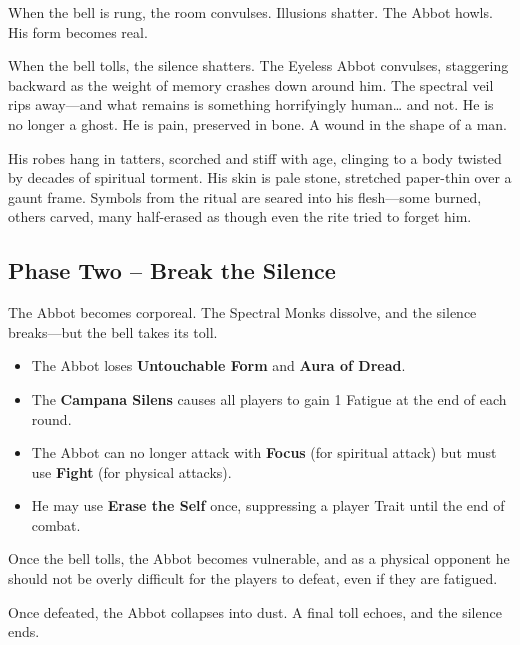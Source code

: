 \documentclass[twocolumn,nodeprecatedcode,bg=print]{dndbook/dndbook}
\begin{document}
When the bell is rung, the room convulses. Illusions shatter. The Abbot howls. His form becomes real.

\begin{WyrdExample}
    When the bell tolls, the silence shatters.  The Eyeless Abbot convulses, staggering backward as the weight of memory crashes down around him. The spectral veil rips away—and what remains is something horrifyingly human… and not. He is no longer a ghost. He is pain, preserved in bone. A wound in the shape of a man.
    
    His robes hang in tatters, scorched and stiff with age, clinging to a body twisted by decades of spiritual torment. His skin is pale stone, stretched paper-thin over a gaunt frame. Symbols from the ritual are seared into his flesh—some burned, others carved, many half-erased as though even the rite tried to forget him.
\end{WyrdExample}


\subsection*{Phase Two – Break the Silence}

The Abbot becomes corporeal. The Spectral Monks dissolve, and the silence breaks—but the bell takes its toll.

\begin{WyrdExample}
    \begin{itemize}
    \item The Abbot loses \textbf{Untouchable Form} and \textbf{Aura of Dread}.
    \item The \textbf{Campana Silens} causes all players to gain 1 Fatigue at the end of each round.
    \item The Abbot can no longer attack with \textbf{Focus} (for spiritual attack) but must use \textbf{Fight} (for physical attacks).
    \item He may use \textbf{Erase the Self} once, suppressing a player Trait until the end of combat.
    \end{itemize}
\end{WyrdExample}

Once the bell tolls, the Abbot becomes vulnerable, and as a physical opponent he should not be overly difficult for the players to defeat, even if they are fatigued. 

Once defeated, the Abbot collapses into dust. A final toll echoes, and the silence ends.
\end{document}
